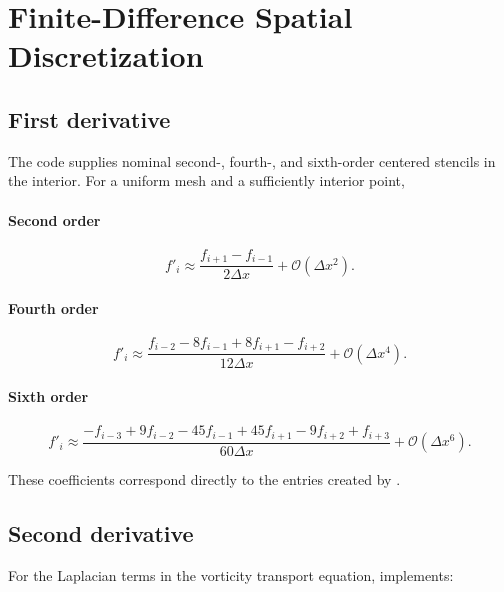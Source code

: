 \documentclass[11pt,a4paper]{article}
\newcommand{\Oh}{\mathcal{O}}
\newcommand{\code}[1]{\texttt{\detokenize{#1}}}
\begin{document}
\section{Finite-Difference Spatial Discretization}

\subsection{First derivative}

The code supplies nominal second-, fourth-, and sixth-order centered stencils in the interior.  For a uniform mesh and a sufficiently interior point,

\paragraph{Second order}
\begin{equation}
 f'_i \approx \frac{f_{i+1}-f_{i-1}}{2\Delta x}
 +\Oh(\Delta x^2).
\end{equation}

\paragraph{Fourth order}
\begin{equation}
 f'_i \approx
 \frac{f_{i-2}-8f_{i-1}+8f_{i+1}-f_{i+2}}
 {12\Delta x}
 +\Oh(\Delta x^4).
\end{equation}

\paragraph{Sixth order}
\begin{equation}
 f'_i \approx
 \frac{-f_{i-3}+9f_{i-2}-45f_{i-1}+45f_{i+1}-9f_{i+2}+f_{i+3}}
 {60\Delta x}
 +\Oh(\Delta x^6).
\label{eq:first-sixth}
\end{equation}

These coefficients correspond directly to the entries created by \code{SDiff1()}.

\subsection{Second derivative}

For the Laplacian terms in the vorticity transport equation, \code{SDiff2()} implements:
\end{document}
